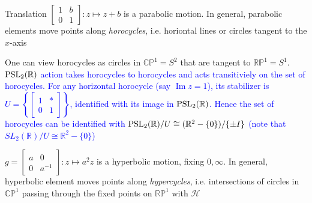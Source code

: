 \documentclass[main.tex]{subfiles}
\begin{document}
\begin{example}
Translation $\begin{bmatrix}
1&b\\
0&1
\end{bmatrix}:z\mapsto z+b$ is a parabolic motion. In general, parabolic elements move points along \textit{horocycles}, i.e. horiontal lines or circles tangent to the $x$-axis
\begin{center}
\end{center}
One can view horocycles as circles in $\mathbb{CP}^1=S^2$ that are tangent to $\mathbb{RP}^1=S^1$.
\textcolor{blue}{
$\operatorname{PSL}_2(\mathbb R)$ action takes horocycles to horocycles and acts transitiviely on the set of horocycles. For any horizontal horocycle (say $\operatorname{Im}z=1$), its stabilizer is $U=\left\{\begin{bmatrix}
1&*\\
0&1
\end{bmatrix}\right\}$, identified with its image in $\operatorname{PSL}_2(\mathbb R)$. Hence the set of horocycles can be identified with $\operatorname{PSL}_2(\mathbb R)/U\cong(\mathbb R^2-\{0\})/\{\pm I\}$ (note that $SL_2(\mathbb R)/U\cong\mathbb R^2-\{0\}$)
}
\end{example}

\begin{example}
$g=\begin{bmatrix}
a&0 \\
0&a^{-1}
\end{bmatrix}:z\mapsto a^2z$ is a hyperbolic motion, fixing $0,\infty$. In general, hyperbolic element moves points along \textit{hypercycles}, i.e. intersections of circles in $\mathbb{CP}^1$ passing through the fixed points on $\mathbb {RP}^1$ with $\mathcal H$
\begin{center}
\end{center}
\end{example}
\end{document}
